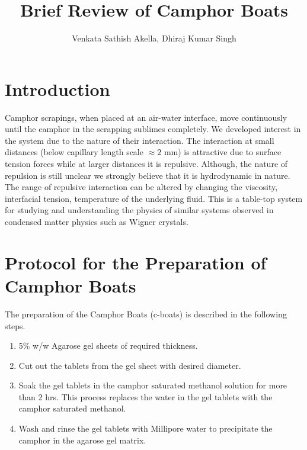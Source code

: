 \documentclass[12pt]{article}
\begin{document}
\author{Venkata Sathish Akella, Dhiraj Kumar Singh}
\title{Brief Review of Camphor Boats}
\maketitle

\section{Introduction}
Camphor scrapings, when placed at an air-water interface, move continuously until the camphor in the scrapping sublimes completely. We developed interest in the system due to the nature of their interaction. The interaction at small distances (below capillary length scale $\approx 2 \textrm{ mm}$) is attractive due to surface tension forces while at larger distances it is repulsive. Although, the nature of repulsion is still unclear we strongly believe that it is hydrodynamic in nature. The range of repulsive interaction can be altered by changing the viscosity, interfacial tension, temperature of the underlying fluid. This is a table-top system for studying and understanding the physics of similar systems observed in condensed matter physics such as Wigner crystals.

\section{Protocol for the Preparation of Camphor Boats}
The preparation of the Camphor Boats (c-boats) is described in the following steps.

\begin{enumerate}
\item 5\% w/w Agarose gel sheets of required thickness. 
\item Cut out the tablets from the gel sheet with desired diameter.
\item Soak the gel tablets in the camphor saturated methanol solution for more than 2 hrs. This process replaces the water in the gel tablets with the camphor saturated methanol.
\item Wash and rinse the gel tablets with Millipore water to precipitate the camphor in the agarose gel matrix.
\end{enumerate}
\end{document}
